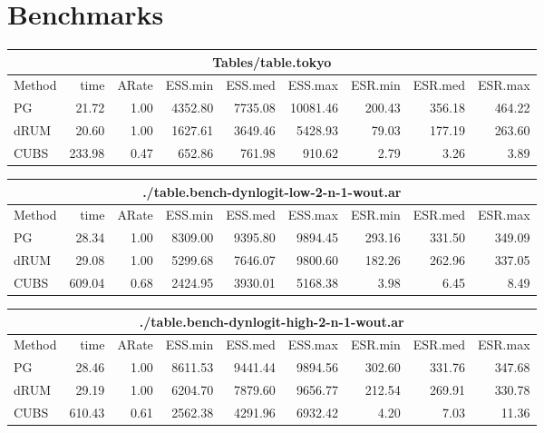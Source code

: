 \documentclass[11pt]{article}
\begin{document}
\appendix

\section{Benchmarks}

\begin{table}

\begin{tabular}{l r r r r r r r r } 
\hline
\multicolumn{9}{c}{Tables/table.tokyo} \\
\hline
          Method  &     time &    ARate &  ESS.min &  ESS.med &  ESS.max &  ESR.min &  ESR.med &  ESR.max \\ 
              PG  &    21.72 &     1.00 &  4352.80 &  7735.08 & 10081.46 &   200.43 &   356.18 &   464.22 \\ 
            dRUM  &    20.60 &     1.00 &  1627.61 &  3649.46 &  5428.93 &    79.03 &   177.19 &   263.60 \\ 
            CUBS  &   233.98 &     0.47 &   652.86 &   761.98 &   910.62 &     2.79 &     3.26 &     3.89
 \end{tabular}


\begin{tabular}{l r r r r r r r r } 
\hline
\multicolumn{9}{c}{./table.bench-dynlogit-low-2-n-1-wout.ar} \\
\hline
          Method  &     time &    ARate &  ESS.min &  ESS.med &  ESS.max &  ESR.min &  ESR.med &  ESR.max \\ 
              PG  &    28.34 &     1.00 &  8309.00 &  9395.80 &  9894.45 &   293.16 &   331.50 &   349.09 \\ 
            dRUM  &    29.08 &     1.00 &  5299.68 &  7646.07 &  9800.60 &   182.26 &   262.96 &   337.05 \\ 
            CUBS  &   609.04 &     0.68 &  2424.95 &  3930.01 &  5168.38 &     3.98 &     6.45 &     8.49
 \end{tabular}

\begin{tabular}{l r r r r r r r r } 
\hline
\multicolumn{9}{c}{./table.bench-dynlogit-high-2-n-1-wout.ar} \\
\hline
          Method  &     time &    ARate &  ESS.min &  ESS.med &  ESS.max &  ESR.min &  ESR.med &  ESR.max \\ 
              PG  &    28.46 &     1.00 &  8611.53 &  9441.44 &  9894.56 &   302.60 &   331.76 &   347.68 \\ 
            dRUM  &    29.19 &     1.00 &  6204.70 &  7879.60 &  9656.77 &   212.54 &   269.91 &   330.78 \\ 
            CUBS  &   610.43 &     0.61 &  2562.38 &  4291.96 &  6932.42 &     4.20 &     7.03 &    11.36
 \end{tabular}


\end{table}
\end{document}
